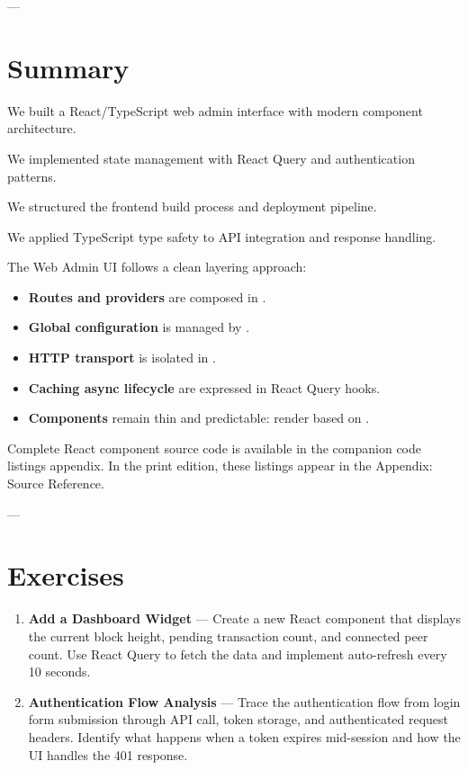 ---

\section{Summary}
\label{sec:ch21-summary}

\begin{chaptersummary}
\item We built a React/TypeScript web admin interface with modern component architecture.
\item We implemented state management with React Query and authentication patterns.
\item We structured the frontend build process and deployment pipeline.
\item We applied TypeScript type safety to API integration and response handling.
\end{chaptersummary}

The Web Admin UI follows a clean layering approach:

\begin{itemize}
  \item \textbf{Routes and providers} are composed in .
  \item \textbf{Global configuration} is managed by .
  \item \textbf{HTTP transport} is isolated in .
  \item \textbf{Caching \code{+} async lifecycle} are expressed in React Query hooks.
  \item \textbf{Components} remain thin and predictable: render based on .
\end{itemize}

\begin{infobox}
Complete React component source code is available in the companion code listings appendix. In the print edition, these listings appear in the Appendix: Source Reference.
\end{infobox}

---

\section{Exercises}
\label{sec:ch21-exercises}

\begin{enumerate}
  \item \textbf{Add a Dashboard Widget} --- Create a new React component that displays the current block height, pending transaction count, and connected peer count. Use React Query to fetch the data and implement auto-refresh every 10 seconds.

  \item \textbf{Authentication Flow Analysis} --- Trace the authentication flow from login form submission through API call, token storage, and authenticated request headers. Identify what happens when a token expires mid-session and how the UI handles the 401 response.
\end{enumerate}


